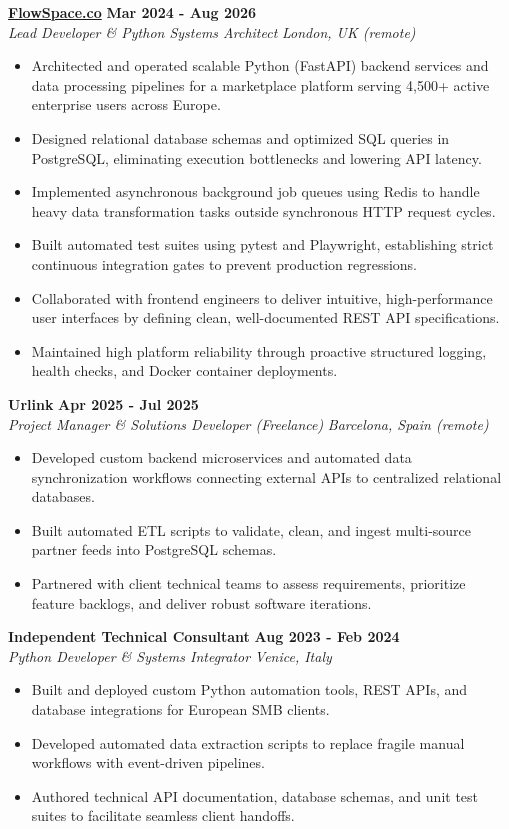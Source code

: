 \documentclass[10pt,a4paper]{article}
\newcommand{\role}[4]{%
  \textbf{#1} \hfill \textbf{#2}\\[1pt]%
  \textit{#3} \hfill \textit{#4}\\[2pt]%
}
\begin{document}
\role{\href{https://flowspace.co}{FlowSpace.co}}{Mar 2024 - Aug 2026}{Lead Developer \& Python Systems Architect}{London, UK (remote)}
\begin{itemize}
  \item Architected and operated scalable Python (FastAPI) backend services and data processing pipelines for a marketplace platform serving 4,500+ active enterprise users across Europe.
  \item Designed relational database schemas and optimized SQL queries in PostgreSQL, eliminating execution bottlenecks and lowering API latency.
  \item Implemented asynchronous background job queues using Redis to handle heavy data transformation tasks outside synchronous HTTP request cycles.
  \item Built automated test suites using pytest and Playwright, establishing strict continuous integration gates to prevent production regressions.
  \item Collaborated with frontend engineers to deliver intuitive, high-performance user interfaces by defining clean, well-documented REST API specifications.
  \item Maintained high platform reliability through proactive structured logging, health checks, and Docker container deployments.
\end{itemize}

\role{Urlink}{Apr 2025 - Jul 2025}{Project Manager \& Solutions Developer (Freelance)}{Barcelona, Spain (remote)}
\begin{itemize}
  \item Developed custom backend microservices and automated data synchronization workflows connecting external APIs to centralized relational databases.
  \item Built automated ETL scripts to validate, clean, and ingest multi-source partner feeds into PostgreSQL schemas.
  \item Partnered with client technical teams to assess requirements, prioritize feature backlogs, and deliver robust software iterations.
\end{itemize}

\role{Independent Technical Consultant}{Aug 2023 - Feb 2024}{Python Developer \& Systems Integrator}{Venice, Italy}
\begin{itemize}
  \item Built and deployed custom Python automation tools, REST APIs, and database integrations for European SMB clients.
  \item Developed automated data extraction scripts to replace fragile manual workflows with event-driven pipelines.
  \item Authored technical API documentation, database schemas, and unit test suites to facilitate seamless client handoffs.
\end{itemize}
\end{document}
